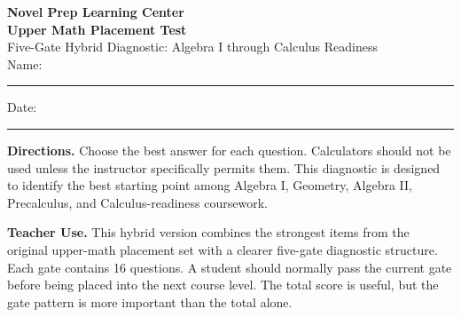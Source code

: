 \documentclass[11pt]{article}
\newcommand{\ansline}{\rule{2.35in}{0.4pt}}
\begin{document}
\begin{center}
  {\Large\bfseries Novel Prep Learning Center}\\[0.12cm]
  {\LARGE\bfseries\textcolor{npDeep}{Upper Math Placement Test}}\\[0.12cm]
  {\large Five-Gate Hybrid Diagnostic: Algebra I through Calculus Readiness}\\[0.45cm]
  Name:\ \ansline \hfill Date:\ \ansline
\end{center}

\begin{titlebox}
\textbf{Directions.} Choose the best answer for each question. Calculators should not be used unless the instructor specifically permits them. This diagnostic is designed to identify the best starting point among Algebra I, Geometry, Algebra II, Precalculus, and Calculus-readiness coursework.
\end{titlebox}

\begin{guidebox}
\textbf{Teacher Use.} This hybrid version combines the strongest items from the original upper-math placement set with a clearer five-gate diagnostic structure. Each gate contains 16 questions. A student should normally pass the current gate before being placed into the next course level. The total score is useful, but the gate pattern is more important than the total alone.
\end{guidebox}
\end{document}
